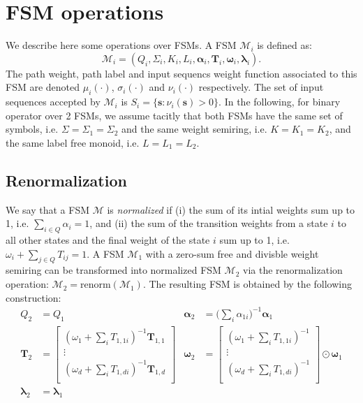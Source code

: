 \section{FSM operations}
\label{sec:fsmops}

We describe here some operations over FSMs. A FSM $\mathcal{M}_i$ is
defined as:
\begin{equation}
    \mathcal{M}_i = (Q_i, \Sigma_i, K_i, L_i, \boldsymbol{\alpha}_i,
        \mathbf{T}_i, \boldsymbol{\omega}_i, \boldsymbol{\lambda}_i).
\end{equation}
The path weight, path label and input sequencs weight function
associated to this FSM are denoted $\mu_i(\cdot)$, $\sigma_i(\cdot)$ and
$\nu_i(\cdot)$ respectively. The set of input sequences accepted by
$\mathcal{M}_i$ is $S_i = \{\mathbf{s}: \nu_i(\mathbf{s}) > 0 \}$. In
the following, for binary operator over 2 FSMs, we assume tacitly that
both FSMs have the same set of symbols, i.e. $\Sigma = \Sigma_1 = \Sigma_2$
and the same weight semiring, i.e. $K = K_1 = K_2$, and the same
label free monoid, i.e. $L = L_1 = L_2$.

\subsection{Renormalization}

We say that a FSM $\mathcal{M}$ is \emph{normalized} if (i) the sum
of its intial weights sum up to 1, i.e. $\sum_{i \in Q} \alpha_i = 1$,
and (ii) the sum of the transition weights from a state $i$ to all
other states and the final weight of the
state $i$ sum up to 1, i.e. $\omega_i + \sum_{j \in Q} T_{ij} = 1$.
A FSM $\mathcal{M}_1$ with a zero-sum free and divisble weight
semiring can be transformed into normalized FSM $\mathcal{M}_2$ via
the renormalization operation: $\mathcal{M}_2 = \text{renorm}(\mathcal{M}_1)$.
The resulting FSM is obtained by the following construction:
\begin{align}
    Q_2 &= Q_1 & \boldsymbol{\alpha}_2 &=
        \Big(\sum_i \alpha_{1i} \Big)^{-1}\boldsymbol{\alpha}_{1}  \\
        \mathbf{T}_2 &= \begin{bmatrix}
            (\omega_1 + \sum_i T_{1,1i})^{-1} \mathbf{T}_{1,1} \\
            \vdots \\
            (\omega_d + \sum_i T_{1,di})^{-1} \mathbf{T}_{1,d} \\
        \end{bmatrix} & \boldsymbol{\omega}_2 &= \begin{bmatrix}
        (\omega_1 + \sum_i T_{1,1i})^{-1} \\
        \vdots \\
        (\omega_d + \sum_i T_{1,di})^{-1} \\
        \end{bmatrix} \odot \boldsymbol{\omega}_1 \\
        \boldsymbol{\lambda}_2 &= \boldsymbol{\lambda}_1 & &
\end{align}


